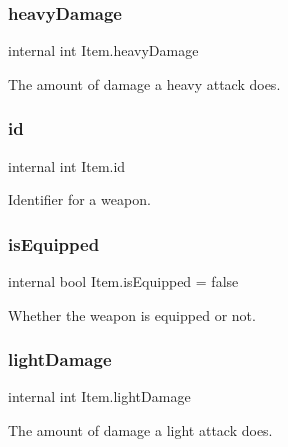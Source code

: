 \subsubsection{\texorpdfstring{heavyDamage}{heavyDamage}}
{\footnotesize\ttfamily internal int Item.\+heavy\+Damage\hspace{0.3cm}{\ttfamily [private]}}



The amount of damage a heavy attack does. 

\mbox{\label{class_item_a9984ca55c1a202a7f57cabded88bd929}} 
\subsubsection{\texorpdfstring{id}{id}}
{\footnotesize\ttfamily internal int Item.\+id\hspace{0.3cm}{\ttfamily [private]}}



Identifier for a weapon. 

\mbox{\label{class_item_afad013640f1c29591ae9977169888fec}} 
\subsubsection{\texorpdfstring{isEquipped}{isEquipped}}
{\footnotesize\ttfamily internal bool Item.\+is\+Equipped = false\hspace{0.3cm}{\ttfamily [private]}}



Whether the weapon is equipped or not. 

\mbox{\label{class_item_a9ae19965752f0c33f80ed0b361f8172c}} 
\subsubsection{\texorpdfstring{lightDamage}{lightDamage}}
{\footnotesize\ttfamily internal int Item.\+light\+Damage\hspace{0.3cm}{\ttfamily [private]}}



The amount of damage a light attack does. 

